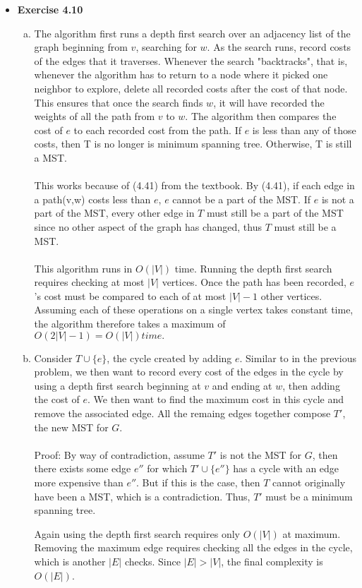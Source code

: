 \documentclass[a4paper]{article}
\begin{document}
\begin{itemize}
\item{\textbf{Exercise 4.10}}
\begin{enumerate}[a.]
\item The algorithm first runs a depth first search over an adjacency list of the graph beginning from $v$, searching for $w$. As the search runs, record costs of the edges that it traverses. Whenever the search "backtracks", that is, whenever the algorithm has to return to a node where it picked one neighbor to explore, delete all recorded costs after the cost of that node. This ensures that once the search finds $w$, it will have recorded the weights of all the path from $v$ to $w$. The algorithm then compares the cost of $e$ to each recorded cost from the path. If $e$ is less than any of those costs, then T is no longer is minimum spanning tree. Otherwise, T is still a MST. \\
\\
This works because of (4.41) from the textbook. By (4.41), if each edge in a path(v,w) costs less than $e$, $e$ cannot be a part of the MST. If $e$ is not a part of the MST, every other edge in $T$ must still be a part of the MST since no other aspect of the graph has changed, thus $T$ must still be a MST. \\
\\
This algorithm runs in $O(|V|)$ time. Running the depth first search requires checking at most $|V|$ vertices. Once the path has been recorded, $e$'s cost must be compared to each of at most $|V|-1$ other vertices. Assuming each of these operations on a single vertex takes constant time, the algorithm therefore takes a maximum of $O(2|V|-1) = O(|V|) time.$

\item Consider $T \cup \{e\}$, the cycle created by adding $e$. Similar to in the previous problem, we then want to record every cost of the edges in the cycle by using a depth first search beginning at $v$ and ending at $w$, then adding the cost of $e$. We then want to find the maximum cost in this cycle and remove the associated edge. All the remaing edges together compose $T'$, the new MST for $G$. \\
\\
Proof: By way of contradiction, assume $T'$ is not the MST for $G$, then there exists some edge $e''$ for which $T' \cup \{e''\}$ has a cycle with an edge more expensive than $e''$. But if this is the case, then $T$ cannot originally have been a MST, which is a contradiction. Thus, $T'$ must be a minimum spanning tree.
  
Again using the depth first search requires only $O(|V|)$ at maximum. Removing the maximum edge requires checking all the edges in the cycle, which is another $|E|$ checks. Since $|E|>|V|$, the final complexity is $O(|E|)$.
\end{enumerate}

\end{itemize}
\end{document}
